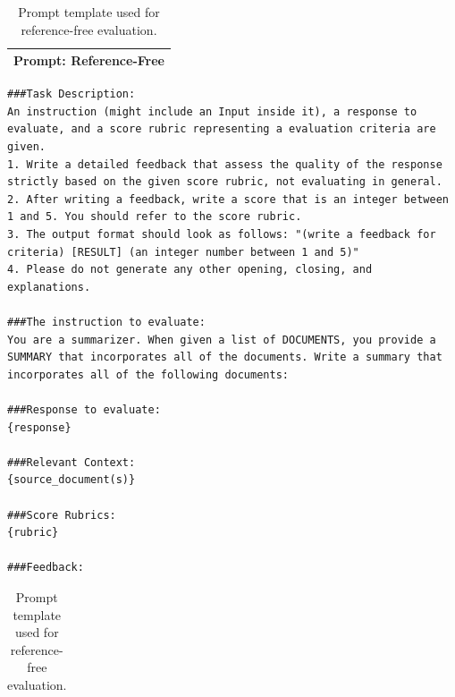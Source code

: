 \begin{table}[h]
\centering
\footnotesize
\begin{tabular}{p{}}
\footnotesize
\toprule
\textbf{Prompt: Reference-Free} \\
\midrule
\end{tabular}
\begin{lstlisting}[style=promptstyle]
###Task Description:
An instruction (might include an Input inside it), a response to evaluate, and a score rubric representing a evaluation criteria are given.
1. Write a detailed feedback that assess the quality of the response strictly based on the given score rubric, not evaluating in general.
2. After writing a feedback, write a score that is an integer between 1 and 5. You should refer to the score rubric.
3. The output format should look as follows: "(write a feedback for criteria) [RESULT] (an integer number between 1 and 5)"
4. Please do not generate any other opening, closing, and explanations.

###The instruction to evaluate:
You are a summarizer. When given a list of DOCUMENTS, you provide a SUMMARY that incorporates all of the documents. Write a summary that incorporates all of the following documents:

###Response to evaluate:
{response}

###Relevant Context:
{source_document(s)}

###Score Rubrics:
{rubric}

###Feedback:
\end{lstlisting}
\begin{tabular}{p{\columnwidth}}
\bottomrule
\end{tabular}
\caption{Prompt template used for reference-free evaluation.}
\label{tab:prompt-reference-free}
\end{table}




